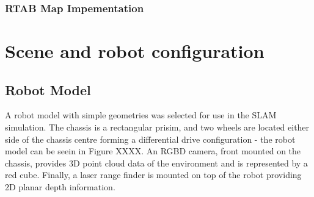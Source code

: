 \documentclass[a4paper]{article}
\begin{document}
\subsubsection{RTAB Map Impementation}

\section{Scene and robot configuration}
\subsection{Robot Model}
A robot model with simple geometries was selected for use in the SLAM simulation. The chassis is a rectangular prisim, and two wheels are located either side of the chassis centre forming a differential drive configuration - the robot model can be seein in Figure XXXX. An RGBD camera, front mounted on the chassis, provides 3D point cloud data of the environment and is represented by a red cube. Finally, a laser range finder is mounted on top of the robot providing 2D planar depth information.\\
\end{document}
